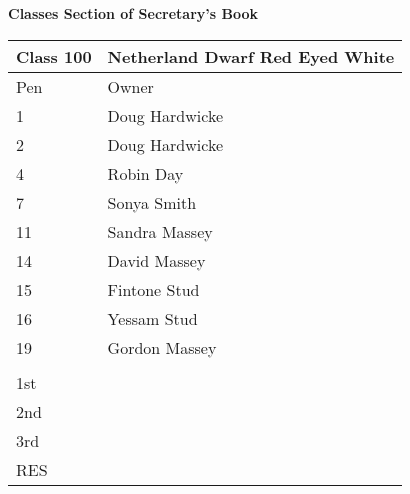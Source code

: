\documentclass[a4paper,11pt]{report}
\begin{document}
\newline
\newline
\textbf{Classes Section of Secretary's Book}\newline 
\begin{tabular}{|l| p{10cm} |} \hline
Class 100 & Netherland Dwarf Red Eyed White  \\ \hline
Pen&Owner \\ \hline
1& Doug Hardwicke  \\ \hline
2& Doug Hardwicke \\ \hline
4& Robin Day  \\ \hline
7& Sonya Smith \\ \hline
11& Sandra Massey \\ \hline
14& David Massey \\ \hline
15& Fintone Stud \\ \hline
16& Yessam Stud \\ \hline
19& Gordon Massey \\ \hline
 & \\ \hline
1st & \\ \hline
2nd & \\ \hline
3rd & \\ \hline 
RES & \\ \hline
\end{tabular}
\newline \newline 
\end{document}
